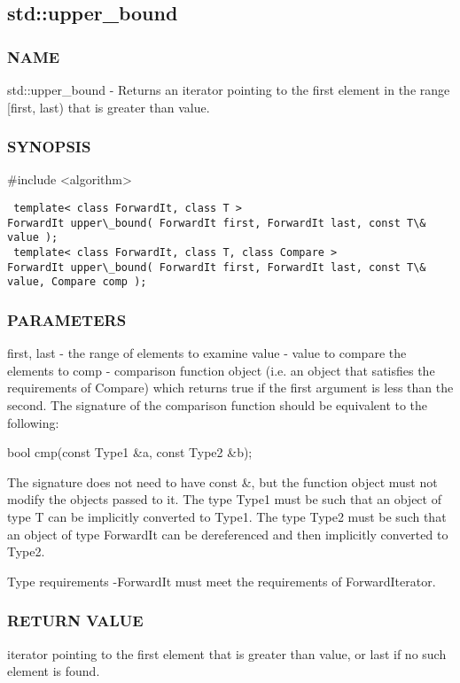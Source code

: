 \subsection{std::upper\_bound}

\subsubsection{NAME}
std::upper\_bound - Returns an iterator pointing to the first element in the range [first, last) that is greater than value.

\subsubsection{SYNOPSIS}
\#include <algorithm>

\begin{lstlisting}
 template< class ForwardIt, class T >
ForwardIt upper\_bound( ForwardIt first, ForwardIt last, const T\& value );
 template< class ForwardIt, class T, class Compare >
ForwardIt upper\_bound( ForwardIt first, ForwardIt last, const T\& value, Compare comp );
\end{lstlisting}

\subsubsection{PARAMETERS}
first, last - the range of elements to examine
value - value to compare the elements to
comp - comparison function object (i.e. an object that satisfies the requirements of Compare) which returns true if the first argument is less than the second.
The signature of the comparison function should be equivalent to the following:

 bool cmp(const Type1 \&a, const Type2 \&b);

The signature does not need to have const \&, but the function object must not modify the objects passed to it.
The type Type1 must be such that an object of type T can be implicitly converted to Type1. The type Type2 must be such that an object of type ForwardIt can be dereferenced and then implicitly converted to Type2.

 Type requirements
 -ForwardIt must meet the requirements of ForwardIterator.

\subsubsection{RETURN VALUE}
iterator pointing to the first element that is greater than value, or last if no such element is found.



